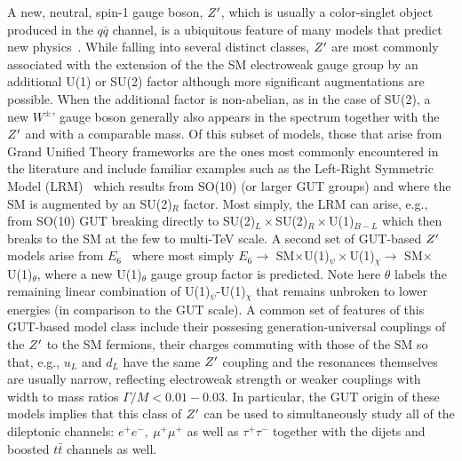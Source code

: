 \documentclass[a4paper,11pt]{article}
\begin{document}
A new, neutral, spin-1 gauge boson, $Z^{\prime}$, which is usually a color-singlet object produced in the $q\bar q$ channel, is a ubiquitous feature of many models that predict new
physics~\cite{Langacker:2008yv,Rizzo:2006nw,Carena:2004xs,Salvioni:2009mt}.  While falling into several distinct classes, $Z^{\prime}$ are most commonly associated with the
extension of the the SM electroweak gauge group by an additional U(1) or SU(2) factor although more significant augmentations are possible. When the additional factor is non-abelian,
as in the case of SU(2), a new $W^\pm$' gauge boson generally also appears in the spectrum together with the $Z^{\prime}$ and with a comparable mass.  Of this subset of models, those
that arise from Grand Unified Theory frameworks are the ones most commonly encountered in the literature and include familiar examples such as the Left-Right Symmetric
Model (LRM)~\cite{Senjanovic:1975rk,Mohapatra:1980yp} which results from SO(10)
(or larger GUT groups) and where the SM is augmented by an SU(2)$_R$ factor. Most simply, the LRM can arise, e.g., from SO(10) GUT breaking directly to
SU(2)$_L \times$SU(2)$_R \times$U(1)$_{B-L}$ which then breaks to the SM at the few to multi-TeV scale. A second set of GUT-based $Z^{\prime}$ models arise from
$E_6$~\cite{Robinett:1982tq,London:1986dk,Hewett:1988xc,Joglekar:2016yap} where most simply $E_6 \rightarrow$ SM$\times$U(1)$_\psi \times$U(1)$_\chi \rightarrow $ SM$
\times$U(1)$_\theta$, where a new U(1)$_\theta$ gauge group factor is predicted. Note here $\theta$ labels the remaining linear combination of U(1)$_\psi$-U(1)$_\chi$ that remains
unbroken to lower energies (in comparison to the GUT scale).  A common set of features of this GUT-based model class include their possesing generation-universal couplings
of the $Z^{\prime}$ to the SM fermions, their charges commuting with those of the SM so that, e.g., $u_L$ and $d_L$ have the same $Z^{\prime}$ coupling and the resonances themselves are usually
narrow, reflecting electroweak strength or weaker couplings with width to mass ratios $\Gamma/M < 0.01-0.03$. In particular, the GUT origin of these models
implies that this class of $Z^{\prime}$ can be used to simultaneously study all of the dileptonic channels: $e^+e^-,~\mu^+\mu^+$ as well as $\tau^+\tau^-$ together with the dijets and boosted
$t\bar t$ channels as well.
\end{document}
